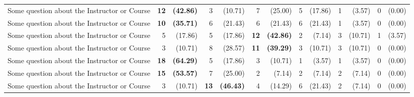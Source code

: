 \documentclass[12pt, oneside, landscape]{memoir}
\newcommand{\myrowcolour}{\rowcolor[gray]{0.925}}
\newcommand{\highest}[1]{\textbf{#1}}%
\newcommand{\highest}[1]{\textcolor{Maroon}{\textbf{#1}}}%
\begin{document}
\begin{longtable}{@{}l rr rr rr rr rr rr}
\myrowcolour%
Some question about the Instructor or Course & \highest{12} &
\highest{(42.86)} & 3 & (10.71) & 7
& (25.00) & 5 & (17.86) & 1 & (3.57) & 0 & (0.00) \\

Some question about the Instructor or Course & \highest{10} &
\highest{(35.71)} & 6 & (21.43) & 6 & (21.43) & 6 & (21.43)
& 1 & (3.57) & 0 & (0.00) \\

\myrowcolour%
Some question about the Instructor or Course & 5 & (17.86) & 5 &
(17.86) & \highest{12} & \highest{(42.86)} & 2 & (7.14)
& 3 & (10.71) & 1 & (3.57)\\

Some question about the Instructor or Course & 3 & (10.71) & 8 &
(28.57) & \highest{11} & \highest{(39.29)} & 3 & (10.71) & 3 & (10.71)
& 0 & (0.00) \\

\myrowcolour%
Some question about the Instructor or Course & \highest{18} &
\highest{(64.29)}
& 5 & (17.86) & 3 & (10.71) & 1 & (3.57) & 1 & (3.57) & 0 & (0.00) \\

Some question about the Instructor or Course & \highest{15} &
\highest{(53.57)}
& 7 & (25.00) & 2 & (7.14) & 2 & (7.14) & 2 & (7.14) & 0 & (0.00) \\

\myrowcolour%
Some question about the Instructor or Course & 3 & (10.71) &
\highest{13} & \highest{(46.43)} & 4 & (14.29) & 6 & (21.43) & 2
& (7.14) & 0 & (0.00) \\

\bottomrule

\end{longtable}
\end{document}
